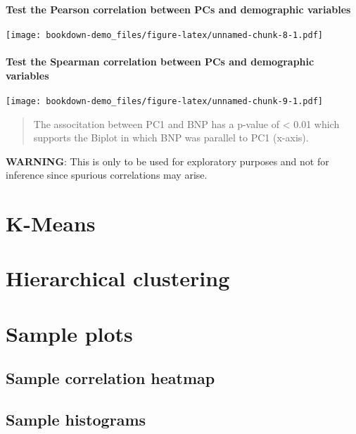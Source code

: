 \documentclass[]{book}
\let\oldparagraph\paragraph
\renewcommand{\paragraph}[1]{\oldparagraph{#1}\mbox{}}
\begin{document}
\paragraph{Test the Pearson correlation between PCs and demographic
variables}\label{test-the-pearson-correlation-between-pcs-and-demographic-variables}

\texttt{[image: bookdown-demo\_files/figure-latex/unnamed-chunk-8-1.pdf]}

\paragraph{Test the Spearman correlation between PCs and demographic
variables}\label{test-the-spearman-correlation-between-pcs-and-demographic-variables}

\texttt{[image: bookdown-demo\_files/figure-latex/unnamed-chunk-9-1.pdf]}

\begin{quote}
The associtation between PC1 and BNP has a p-value of \textless{} 0.01
which supports the Biplot in which BNP was parallel to PC1 (x-axis).
\end{quote}

\textbf{WARNING}: This is only to be used for exploratory purposes and
not for inference since spurious correlations may arise.

\section{K-Means}\label{k-means}

\section{Hierarchical clustering}\label{hierarchical-clustering}

\section{Sample plots}\label{sample-plots}

\subsection{Sample correlation
heatmap}\label{sample-correlation-heatmap}

\subsection{Sample histograms}\label{sample-histograms}
\end{document}
